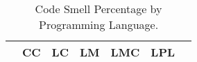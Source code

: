 \begin{table}[h]
    \centering
    \caption{
        \label{tab:percentage_table}
        Code Smell Percentage by Programming Language.
    }
    \renewcommand{\arraystretch}{1.2}
    \begin{tabular}{@{}lrrrrrr@{}}
        \toprule
            {\bf }
            &
            {\bf CC}
            &
            {\bf LC}
            &
            {\bf LM}
            &
            {\bf LMC}
            &
            {\bf LPL}
            \\

        \bottomrule
        

    \end{tabular}
    \vspace{-1em}
\end{table}
